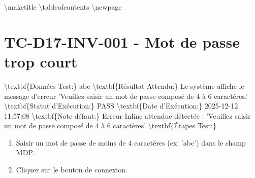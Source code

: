 \documentclass{article}%
\begin{document}
%
\normalsize%
\textbackslash{}maketitle%
\textbackslash{}tableofcontents%
\textbackslash{}newpage%
\section{TC{-}D17{-}INV{-}001 {-} Mot de passe trop court}%
\label{sec:TC{-}D17{-}INV{-}001{-}Motdepassetropcourt}%
\textbackslash{}textbf\{Données Test:\} abc\newline%
\newline%
%
\textbackslash{}textbf\{Résultat Attendu:\} Le système affiche le message d'erreur 'Veuillez saisir un mot de passe composé de 4 à 6 caractères.'\newline%
\newline%
%
\textbackslash{}textbf\{Statut d'Exécution:\} PASS\newline%
\newline%
%
\textbackslash{}textbf\{Date d'Exécution:\} 2025{-}12{-}12 11:57:08\newline%
\newline%
%
\textbackslash{}textbf\{Note défaut:\} Erreur Inline attendue détectée : 'Veuillez saisir un mot de passe composé de 4 à 6 caractères'\newline%
\newline%
%
\textbackslash{}textbf\{Étapes Test:\}\newline%
%
\begin{enumerate}%
\item%
Saisir un mot de passe de moins de 4 caractères (ex: 'abc') dans le champ MDP.%
\item%
Cliquer sur le bouton de connexion.%
\end{enumerate}

%
\end{document}
